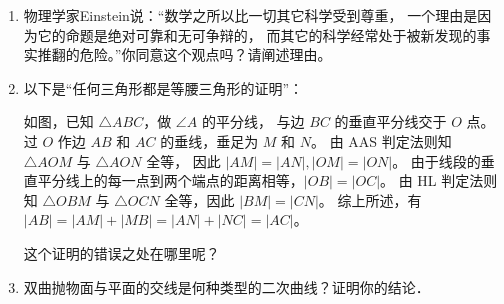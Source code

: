\begin{enumerate}
\item 物理学家Einstein说：``数学之所以比一切其它科学受到尊重，
一个理由是因为它的命题是绝对可靠和无可争辩的，
而其它的科学经常处于被新发现的事实推翻的危险。''你同意这个观点吗？请阐述理由。

\item 以下是``任何三角形都是等腰三角形的证明''：
如图，已知 $\triangle ABC$，做 $\angle A$ 的平分线，
与边 $BC$ 的垂直平分线交于 $O$ 点。
过 $O$ 作边 $AB$ 和 $AC$ 的垂线，垂足为 $M$ 和 $N$。
由 AAS 判定法则知 $\triangle AOM$ 与 $\triangle AON$ 全等，
因此 $|AM|=|AN|,|OM|=|ON|$。
由于线段的垂直平分线上的每一点到两个端点的距离相等，$|OB|=|OC|$。
由 HL 判定法则知 $\triangle OBM$ 与 $\triangle OCN$ 全等，因此 $|BM|=|CN|$。
综上所述，有 $|AB|=|AM|+|MB|=|AN|+|NC|=|AC|$。

这个证明的错误之处在哪里呢？

\item 双曲抛物面与平面的交线是何种类型的二次曲线？证明你的结论．


\end{enumerate}
